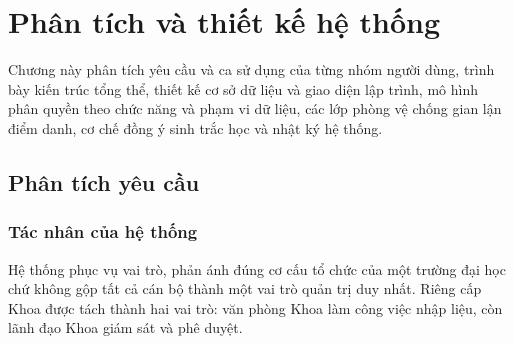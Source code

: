 \chapter{Phân tích và thiết kế hệ thống}
\label{ch:thietke}

\begin{muctieu}
Chương này phân tích yêu cầu và ca sử dụng của từng nhóm người dùng, trình
bày kiến trúc tổng thể, thiết kế cơ sở dữ liệu và giao diện lập trình, mô hình
phân quyền theo chức năng và phạm vi dữ liệu, các lớp phòng vệ chống gian lận
điểm danh, cơ chế đồng ý sinh trắc học và nhật ký hệ thống.
\end{muctieu}

\section{Phân tích yêu cầu}

\subsection{Tác nhân của hệ thống}

Hệ thống phục vụ \FsoVaiTro{} vai trò, phản ánh đúng cơ cấu tổ chức của một
trường đại học chứ không gộp tất cả cán bộ thành một vai trò quản trị duy
nhất. Riêng cấp Khoa được tách thành hai vai trò: văn phòng Khoa làm công
việc nhập liệu, còn lãnh đạo Khoa giám sát và phê duyệt.


